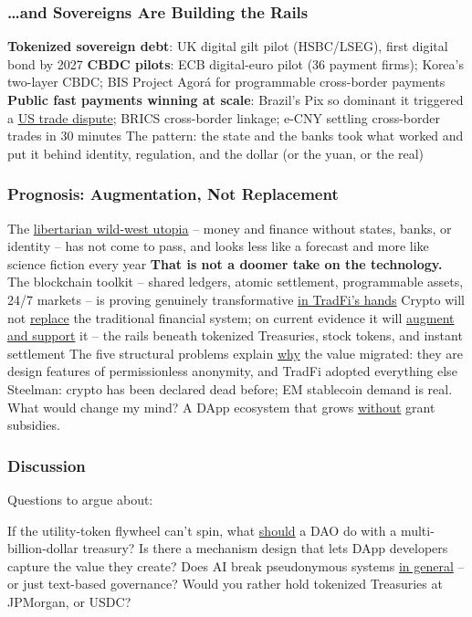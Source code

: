\documentclass[aspectratio=169]{beamer}
\begin{document}
\begin{frame}
\frametitle{\ldots and Sovereigns Are Building the Rails}

\bi
\m \textbf{Tokenized sovereign debt}: UK digital gilt pilot (HSBC/LSEG), first digital bond by 2027 \pause
\m \textbf{CBDC pilots}: ECB digital-euro pilot (36 payment firms); Korea's two-layer CBDC; BIS Project Agor\'a for programmable cross-border payments \pause
\m \textbf{Public fast payments winning at scale}: Brazil's Pix so dominant it triggered a \ul{US trade dispute}; BRICS cross-border linkage; e-CNY settling cross-border trades in 30 minutes \pause
\m The pattern: the state and the banks took what worked and put it behind identity, regulation, and the dollar (or the yuan, or the real)
\ei

\end{frame}

\begin{frame}
\frametitle{Prognosis: Augmentation, Not Replacement}

\bi
\m The \ul{libertarian wild-west utopia} -- money and finance without states, banks, or identity -- has not come to pass, and looks less like a forecast and more like science fiction every year \pause
\m \textbf{That is not a doomer take on the technology.} The blockchain toolkit -- shared ledgers, atomic settlement, programmable assets, 24/7 markets -- is proving genuinely transformative \ul{in TradFi's hands} \pause
\m Crypto will not \ul{replace} the traditional financial system; on current evidence it will \ul{augment and support} it -- the rails beneath tokenized Treasuries, stock tokens, and instant settlement \pause
\m The five structural problems explain \ul{why} the value migrated: they are design features of permissionless anonymity, and TradFi adopted everything else \pause
\m Steelman: crypto has been declared dead before; EM stablecoin demand is real. What would change my mind? A DApp ecosystem that grows \ul{without} grant subsidies.
\ei

\end{frame}

\begin{frame}
\frametitle{Discussion}

\begin{center}
{\Large Questions to argue about:}
\end{center}
\vspace{3mm}
\bi
\m If the utility-token flywheel can't spin, what \ul{should} a DAO do with a multi-billion-dollar treasury? \pause
\m Is there a mechanism design that lets DApp developers capture the value they create? \pause
\m Does AI break pseudonymous systems \ul{in general} -- or just text-based governance? \pause
\m Would you rather hold tokenized Treasuries at JPMorgan, or USDC?
\ei

\end{frame}
\end{document}
